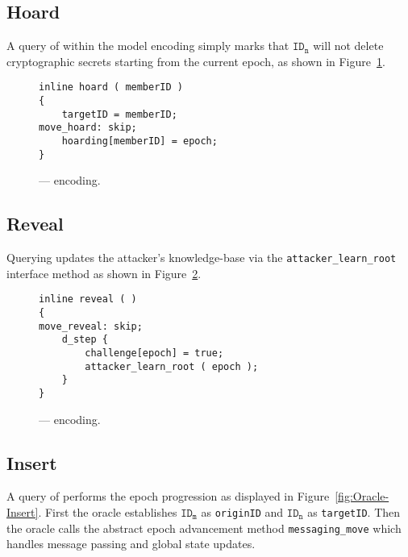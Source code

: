 \hypertarget{sec:hoard}{%
\subsection{Hoard}\label{sec:hoard}}

A query of  within the  model encoding simply marks that \(\mathtt{ID_n}\) will not delete cryptographic secrets starting from the current epoch, as shown in Figure\ \ref{fig:Oracle-Hoard}.

\begin{figure}[ht!]
  \centering
  \caption{\label{fig:Oracle-Hoard}\CGKAmod{}{}{} ---  encoding.}
\begin{verbatim}
inline hoard ( memberID )
{
    targetID = memberID;
move_hoard: skip;
    hoarding[memberID] = epoch;
}
\end{verbatim}
\end{figure}


\hypertarget{reveal}{%
\subsection{Reveal}\label{reveal}}

Querying  updates the attacker's knowledge-base via the \texttt{attacker\_learn\_root} interface method as shown in Figure\ \ref{fig:Oracle-Reveal}.

\begin{figure}[ht!]
  \centering
  \caption{\label{fig:Oracle-Reveal}\CGKAmod{}{}{} ---  encoding.}
\begin{verbatim}
inline reveal ( )
{
move_reveal: skip;
    d_step {
        challenge[epoch] = true;
        attacker_learn_root ( epoch );
    }
}
\end{verbatim}
\end{figure}


\hypertarget{sec:insert}{%
\subsection{Insert}\label{sec:insert}}

A query of  performs the epoch progression as displayed in Figure\ \ref{fig:Oracle-Insert}.
First the oracle establishes \(\mathtt{ID_m}\) as \texttt{originID} and \(\mathtt{ID_n}\) as \texttt{targetID}.
Then the oracle calls the abstract epoch advancement method \texttt{messaging\_move} which handles message passing and global state updates.

